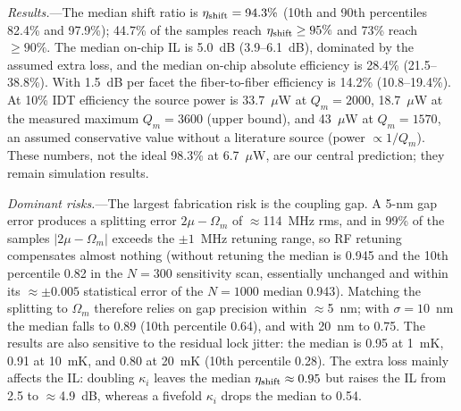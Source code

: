\documentclass[aps,prapplied,reprint,superscriptaddress,amsmath,amssymb,floatfix]{revtex4-2}
\newcommand{\etash}{\eta_{\rm shift}}
\begin{document}
\emph{Results.}---The median shift ratio is $\etash=94.3\%$ (10th and 90th percentiles 82.4\% and 97.9\%); 44.7\% of the samples reach $\etash\ge95\%$ and 73\% reach $\ge90\%$. The median on-chip IL is 5.0~dB (3.9--6.1~dB), dominated by the assumed extra loss, and the median on-chip absolute efficiency is 28.4\% (21.5--38.8\%). With 1.5~dB per facet the fiber-to-fiber efficiency is 14.2\% (10.8--19.4\%). At 10\% IDT efficiency the source power is 33.7~$\mu$W at $Q_m=2000$, 18.7~$\mu$W at the measured maximum $Q_m=3600$ (upper bound), and 43~$\mu$W at $Q_m=1570$, an assumed conservative value without a literature source (power $\propto1/Q_m$). These numbers, not the ideal 98.3\% at 6.7~$\mu$W, are our central prediction; they remain simulation results.

\emph{Dominant risks.}---The largest fabrication risk is the coupling gap. A 5-nm gap error produces a splitting error $2\mu-\Omega_m$ of $\approx$114~MHz rms, and in 99\% of the samples $|2\mu-\Omega_m|$ exceeds the $\pm1$~MHz retuning range, so RF retuning compensates almost nothing (without retuning the median is 0.945 and the 10th percentile 0.82 in the $N=300$ sensitivity scan, essentially unchanged and within its $\approx\pm0.005$ statistical error of the $N=1000$ median 0.943). Matching the splitting to $\Omega_m$ therefore relies on gap precision within $\approx$5~nm; with $\sigma=10$~nm the median falls to 0.89 (10th percentile 0.64), and with 20~nm to 0.75. The results are also sensitive to the residual lock jitter: the median is 0.95 at 1~mK, 0.91 at 10~mK, and 0.80 at 20~mK (10th percentile 0.28). The extra loss mainly affects the IL: doubling $\kappa_i$ leaves the median $\etash\approx0.95$ but raises the IL from 2.5 to $\approx$4.9~dB, whereas a fivefold $\kappa_i$ drops the median to 0.54.

\end{document}
